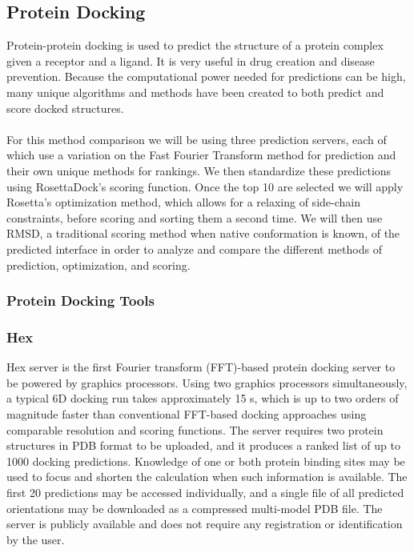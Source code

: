 \documentclass{article}
\begin{document}
\subsection{Protein Docking}

Protein-protein docking is used to predict the structure of a protein complex given a receptor and a ligand. It is very useful in drug creation and disease prevention. Because the computational power needed for predictions can be high, many unique algorithms and methods have been created to both predict and score docked structures.\\\\
For this method comparison we will be using three prediction servers, each of which use a variation on the Fast Fourier Transform method for prediction and their own unique methods for rankings. We then standardize these predictions using RosettaDock's scoring function. Once the top 10 are selected we will apply Rosetta's optimization method, which allows for a relaxing of side-chain constraints, before scoring and sorting them a second time. We will then use RMSD, a traditional scoring method when native conformation is known, of the predicted interface in order to analyze and compare the different methods of prediction, optimization, and scoring.


\subsubsection{Protein Docking Tools}

\subsubsection*{Hex}

Hex server is the first Fourier transform (FFT)-based protein docking server to be powered by graphics processors. Using two graphics processors simultaneously, a typical 6D docking run takes approximately 15 s, which is up to two orders of magnitude faster than conventional FFT-based docking approaches using comparable resolution and scoring functions. The server requires two protein structures in PDB format to be uploaded, and it produces a ranked list of up to 1000 docking predictions. Knowledge of one or both protein binding sites may be used to focus and shorten the calculation when such information is available. The first 20 predictions may be accessed individually, and a single file of all predicted orientations may be downloaded as a compressed multi-model PDB file. The server is publicly available and does not require any registration or identification by the user.
\end{document}
